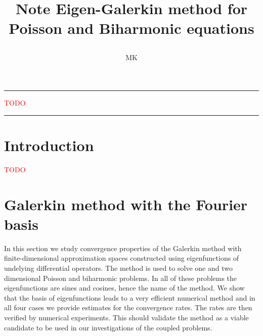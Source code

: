\documentclass[a4paper,10pt]{article}
\renewenvironment{abstract}{%
\hfill\begin{minipage}{0.95\textwidth}
\rule{\textwidth}{1pt}}
{\par\noindent\rule{\textwidth}{1pt}\end{minipage}}
\begin{document}
%
\title{\begin{center}
        Note Eigen-Galerkin method for Poisson and Biharmonic equations
       \end{center}}
\author[1]{MK}
%
\maketitle
%
\begin{abstract}
  \textcolor{red}{TODO}
\end{abstract}

  \section{Introduction}
  \textcolor{red}{TODO}

  \section{Galerkin method with the Fourier basis}
  In this section we study convergence properties of the Galerkin method with 
  finite-dimensional approximation spaces constructed using eigenfunctions of
  undelying differential operators. The method is used to solve one and two
  dimensional Poisson and biharmonic problems. In all of these problems the 
  eigenfunctions are sines and cosines, hence the name of the method. We show 
  that the basis of eigenfunctions leads to a very efficient numerical method
  and in all four cases we provide estimates for the convergence rates.
  The rates are then verified by numerical experiments. This should validate
  the method as a viable candidate to be used in our investigations of the
  coupled problems.
\end{document}
